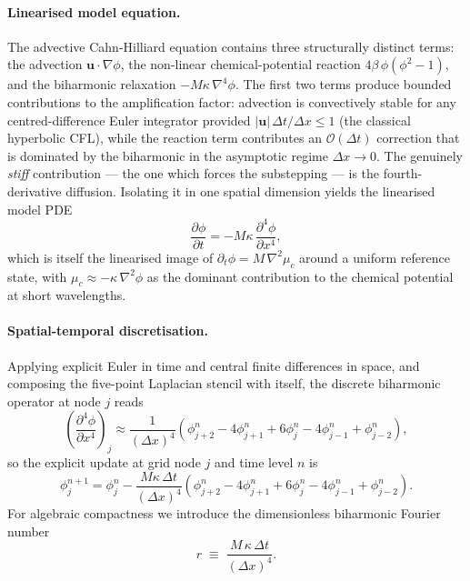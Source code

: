 \paragraph{Linearised model equation.} The advective Cahn-Hilliard equation contains three structurally distinct terms: the advection $\mathbf{u}\!\cdot\!\nabla\phi$, the non-linear chemical-potential reaction $4\beta\,\phi(\phi^2-1)$, and the biharmonic relaxation $-M\kappa\,\nabla^4\phi$.
The first two terms produce bounded contributions to the amplification factor: advection is convectively stable for any centred-difference Euler integrator provided $|\mathbf{u}|\,\Delta t/\Delta x \leq 1$ (the classical hyperbolic CFL), while the reaction term contributes an $\mathcal{O}(\Delta t)$ correction that is dominated by the biharmonic in the asymptotic regime $\Delta x \to 0$.
The genuinely \emph{stiff} contribution --- the one which forces the substepping --- is the fourth-derivative diffusion.
Isolating it in one spatial dimension yields the linearised model PDE
\begin{equation}
    \frac{\partial \phi}{\partial t} = -M\kappa\,\frac{\partial^4 \phi}{\partial x^4},
\end{equation}
which is itself the linearised image of $\partial_t\phi = M\,\nabla^2\mu_c$ around a uniform reference state, with $\mu_c \approx -\kappa\,\nabla^2\phi$ as the dominant contribution to the chemical potential at short wavelengths.

\paragraph{Spatial-temporal discretisation.} Applying explicit Euler in time and central finite differences in space, and composing the five-point Laplacian stencil with itself, the discrete biharmonic operator at node $j$ reads
\begin{equation}
    \left(\frac{\partial^4 \phi}{\partial x^4}\right)_j \approx \frac{1}{(\Delta x)^4}\left( \phi_{j+2}^n - 4\phi_{j+1}^n + 6\phi_j^n - 4\phi_{j-1}^n + \phi_{j-2}^n \right),
\end{equation}
so the explicit update at grid node $j$ and time level $n$ is
\begin{equation}
    \phi_j^{n+1} = \phi_j^n - \frac{M\kappa\,\Delta t}{(\Delta x)^4}\left( \phi_{j+2}^n - 4\phi_{j+1}^n + 6\phi_j^n - 4\phi_{j-1}^n + \phi_{j-2}^n \right).
\end{equation}
For algebraic compactness we introduce the dimensionless biharmonic Fourier number
\begin{equation}
    r \;\equiv\; \frac{M\,\kappa\,\Delta t}{(\Delta x)^4}.
\end{equation}

